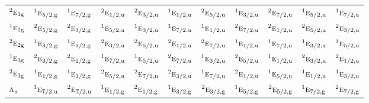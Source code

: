 \documentclass[10pt,a4paper]{article}
\numberwithin{equation}{section}
\newcommand{\irr}[1]{\text{\normalfont\scshape #1}}
\newcommand{\conjpair}[1]{{}^{#1}}
\newcommand{\ptag}[1]{\mathrm{#1}}
\begin{document}
{\begin{longtable}{@{}lcccccccccc@{}}
$\conjpair{2}\irr{e}_{1\ptag{g}}$ & $\conjpair{1}\irr{e}_{5/2,\ptag{g}}$ & $\conjpair{1}\irr{e}_{7/2,\ptag{g}}$ & $\conjpair{2}\irr{e}_{1/2,\ptag{u}}$ & $\conjpair{2}\irr{e}_{3/2,\ptag{u}}$ & $\conjpair{1}\irr{e}_{1/2,\ptag{u}}$ & $\conjpair{2}\irr{e}_{5/2,\ptag{u}}$ & $\conjpair{1}\irr{e}_{3/2,\ptag{u}}$ & $\conjpair{2}\irr{e}_{7/2,\ptag{u}}$ & $\conjpair{1}\irr{e}_{5/2,\ptag{u}}$ & $\conjpair{1}\irr{e}_{7/2,\ptag{u}}$\\
$\conjpair{1}\irr{e}_{2\ptag{g}}$ & $\conjpair{2}\irr{e}_{5/2,\ptag{g}}$ & $\conjpair{2}\irr{e}_{3/2,\ptag{g}}$ & $\conjpair{1}\irr{e}_{5/2,\ptag{u}}$ & $\conjpair{1}\irr{e}_{3/2,\ptag{u}}$ & $\conjpair{1}\irr{e}_{7/2,\ptag{u}}$ & $\conjpair{1}\irr{e}_{1/2,\ptag{u}}$ & $\conjpair{2}\irr{e}_{7/2,\ptag{u}}$ & $\conjpair{2}\irr{e}_{1/2,\ptag{u}}$ & $\conjpair{2}\irr{e}_{5/2,\ptag{u}}$ & $\conjpair{2}\irr{e}_{3/2,\ptag{u}}$\\
$\conjpair{2}\irr{e}_{2\ptag{g}}$ & $\conjpair{1}\irr{e}_{3/2,\ptag{g}}$ & $\conjpair{1}\irr{e}_{5/2,\ptag{g}}$ & $\conjpair{2}\irr{e}_{3/2,\ptag{u}}$ & $\conjpair{2}\irr{e}_{5/2,\ptag{u}}$ & $\conjpair{2}\irr{e}_{1/2,\ptag{u}}$ & $\conjpair{2}\irr{e}_{7/2,\ptag{u}}$ & $\conjpair{1}\irr{e}_{1/2,\ptag{u}}$ & $\conjpair{1}\irr{e}_{7/2,\ptag{u}}$ & $\conjpair{1}\irr{e}_{3/2,\ptag{u}}$ & $\conjpair{1}\irr{e}_{5/2,\ptag{u}}$\\
$\conjpair{1}\irr{e}_{3\ptag{g}}$ & $\conjpair{2}\irr{e}_{3/2,\ptag{g}}$ & $\conjpair{2}\irr{e}_{1/2,\ptag{g}}$ & $\conjpair{1}\irr{e}_{7/2,\ptag{u}}$ & $\conjpair{1}\irr{e}_{5/2,\ptag{u}}$ & $\conjpair{2}\irr{e}_{7/2,\ptag{u}}$ & $\conjpair{1}\irr{e}_{3/2,\ptag{u}}$ & $\conjpair{2}\irr{e}_{5/2,\ptag{u}}$ & $\conjpair{1}\irr{e}_{1/2,\ptag{u}}$ & $\conjpair{2}\irr{e}_{3/2,\ptag{u}}$ & $\conjpair{2}\irr{e}_{1/2,\ptag{u}}$\\
$\conjpair{2}\irr{e}_{3\ptag{g}}$ & $\conjpair{1}\irr{e}_{1/2,\ptag{g}}$ & $\conjpair{1}\irr{e}_{3/2,\ptag{g}}$ & $\conjpair{2}\irr{e}_{5/2,\ptag{u}}$ & $\conjpair{2}\irr{e}_{7/2,\ptag{u}}$ & $\conjpair{2}\irr{e}_{3/2,\ptag{u}}$ & $\conjpair{1}\irr{e}_{7/2,\ptag{u}}$ & $\conjpair{2}\irr{e}_{1/2,\ptag{u}}$ & $\conjpair{1}\irr{e}_{5/2,\ptag{u}}$ & $\conjpair{1}\irr{e}_{1/2,\ptag{u}}$ & $\conjpair{1}\irr{e}_{3/2,\ptag{u}}$\\
$\irr{a}_{\ptag{u}}$ & $\conjpair{1}\irr{e}_{7/2,\ptag{u}}$ & $\conjpair{2}\irr{e}_{7/2,\ptag{u}}$ & $\conjpair{1}\irr{e}_{1/2,\ptag{g}}$ & $\conjpair{2}\irr{e}_{1/2,\ptag{g}}$ & $\conjpair{1}\irr{e}_{3/2,\ptag{g}}$ & $\conjpair{2}\irr{e}_{3/2,\ptag{g}}$ & $\conjpair{1}\irr{e}_{5/2,\ptag{g}}$ & $\conjpair{2}\irr{e}_{5/2,\ptag{g}}$ & $\conjpair{1}\irr{e}_{7/2,\ptag{g}}$ & $\conjpair{2}\irr{e}_{7/2,\ptag{g}}$\\

\end{longtable}}
\end{document}
